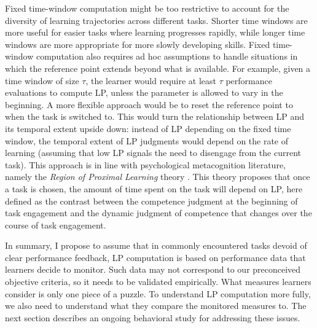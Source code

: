 Fixed time-window computation might be too restrictive to account for the diversity of learning trajectories across different tasks. Shorter time windows are more useful for easier tasks where learning progresses rapidly, while longer time windows are more appropriate for more slowly developing skills. Fixed time-window computation also requires ad hoc assumptions to handle situations in which the reference point extends beyond what is available. For example, given a time window of size $\tau$, the learner would require at least $\tau$ performance evaluations to compute \ac{LP}, unless the parameter is allowed to vary in the beginning. A more flexible approach would be to reset the reference point to when the task is switched to. This would turn the relationship between \ac{LP} and its temporal extent upside down: instead of \ac{LP} depending on the fixed time window, the temporal extent of \ac{LP} judgments would depend on the rate of learning (assuming that low \ac{LP} signals the need to disengage from the current task). This approach is in line with psychological metacognition literature, namely the \emph{Region of Proximal Learning} theory \cite{metcalfe_region_2005}. This theory proposes that once a task is chosen, the amount of time spent on the task will depend on \ac{LP}, here defined as the contrast between the competence judgment at the beginning of task engagement and the dynamic judgment of competence that changes over the course of task engagement.

In summary, I propose to assume that in commonly encountered tasks devoid of clear performance feedback, \ac{LP} computation is based on performance data that learners decide to monitor. Such data may not correspond to our preconceived objective criteria, so it needs to be validated empirically. What measures learners consider is only one piece of a puzzle. To understand \ac{LP} computation more fully, we also need to understand what they compare the monitored measures to. The next section describes an ongoing behavioral study for addressing these issues.

